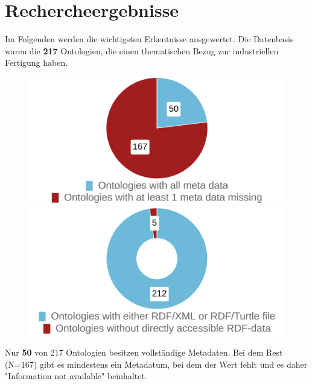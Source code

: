 \documentclass{article}
\begin{document}
\section{Rechercheergebnisse}

Im Folgenden werden die wichtigsten Erkentnisse ausgewertet.
Die Datenbasis waren die \textbf{217} Ontologien, die einen thematischen Bezug zur industriellen Fertigung haben.

\begin{figure}[H]
    \begin{minipage}[c]{0.4\linewidth}
        \includegraphics[scale=0.14]{pie-complete-incomplete-metadata}
        \caption{}
    \end{minipage}
    \hfill
    \begin{minipage}[c]{0.4\linewidth}
        \centering
        \includegraphics[scale=0.14]{pie-files-download-location}
        \caption{}
    \end{minipage}%
\end{figure}

Nur \textbf{50} von 217 Ontologien besitzen vollständige Metadaten.
Bei dem Rest (N=167) gibt es mindestens ein Metadatum, bei dem der Wert fehlt und es daher "Information not available" beinhaltet.
\end{document}
